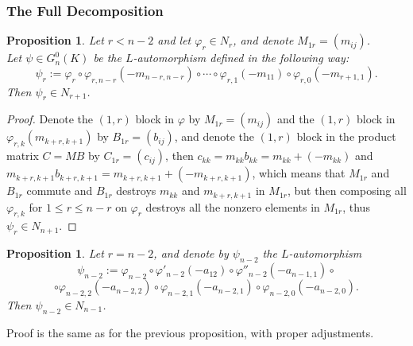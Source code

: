 \documentclass{article}
\newtheorem{proposition}[theorem]{Proposition}
\begin{document}
\subsubsection{The Full Decomposition}
\begin{proposition}
\label{prop:psi.automorphism}
Let $r<n-2$ and let $\varphi_r\in{N}_r$, and denote $M_{1r}=(m_{ij})$. \\
Let $\psi\in{G}_n^0(K)$ be the ${L}$-automorphism defined in the following way:
\[\psi_r:=\varphi_r\circ\varphi_{r,n-r}(-m_{n-r,n-r})\circ\cdots\circ\varphi_{r,1}(-m_{11})\circ\varphi_{r,0}(-m_{r+1,1}).\]
Then $\psi_r\in{N_{r+1}}$.
\end{proposition}
\begin{proof}
Denote the $(1,r)$ block in $\varphi$ by $M_{1r}=(m_{ij})$ and the $(1,r)$ block in $\varphi_{r,k}(m_{k+r,k+1})$ by $B_{1r}=(b_{ij})$, and denote the $(1,r)$ block in the product matrix $C=MB$ by $C_{1r}=(c_{ij})$, then $c_{kk}=m_{kk}b_{kk}=m_{kk}+(-m_{kk})$ and $m_{k+r,k+1}b_{k+r,k+1}=m_{k+r,k+1}+(-m_{k+r,k+1})$, which means that $M_{1r}$ and $B_{1r}$ commute and $B_{1r}$ destroys $m_{kk}$ and $m_{k+r,k+1}$ in $M_{1r}$, but then composing all $\varphi_{r,k}$ for $1\leq{r}\leq{n-r}$ on $\varphi_r$ destroys all the nonzero elements in $M_{1r}$, thus $\psi_r\in{N}_{n+1}$.
\end{proof}
\begin{proposition}
Let $r=n-2$, and denote by $\psi_{n-2}$ the ${L}$-automorphism \[\psi_{n-2}:=\varphi_{n-2}\circ\varphi'_{n-2}(-a_{12})\circ\varphi''_{n-2}(-a_{n-1,1})\circ\]\[\circ\varphi_{n-2,2}(-a_{n-2,2})\circ\varphi_{n-2,1}(-a_{n-2,1})\circ\varphi_{n-2,0}(-a_{n-2,0}).\]
Then $\psi_{n-2}\in{N_{n-1}}$.
\end{proposition}
Proof is the same as for the previous proposition, with proper adjustments.
\end{document}
